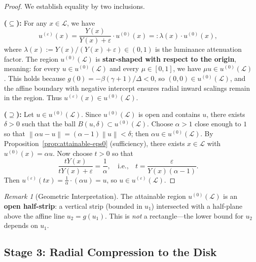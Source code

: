 \documentclass[11pt]{article}
\theoremstyle{plain}
\theoremstyle{definition}
\theoremstyle{remark}
\newtheorem{remark}[theorem]{Remark}
\newcommand{\norm}[1]{\left\lVert #1 \right\rVert}
\begin{document}
\begin{proof}
We establish equality by two inclusions.

\textbf{($\subseteq$):} For any $x \in \mathcal{L}$, we have
\begin{equation}
u^{(\varepsilon)}(x) = \frac{Y(x)}{Y(x) + \varepsilon} \cdot u^{(0)}(x) =: \lambda(x) \cdot u^{(0)}(x),
\end{equation}
where $\lambda(x) := Y(x)/(Y(x) + \varepsilon) \in (0, 1)$ is the luminance attenuation factor. The region $u^{(0)}(\mathcal{L})$ is \textbf{star-shaped with respect to the origin}, meaning: for every $u \in u^{(0)}(\mathcal{L})$ and every $\mu \in [0,1]$, we have $\mu u \in u^{(0)}(\mathcal{L})$. This holds because $g(0) = -\beta(\gamma+1)/\Delta < 0$, so $(0,0) \in u^{(0)}(\mathcal{L})$, and the affine boundary with negative intercept ensures radial inward scalings remain in the region. Thus $u^{(\varepsilon)}(x) \in u^{(0)}(\mathcal{L})$.

\textbf{($\supseteq$):} Let $u \in u^{(0)}(\mathcal{L})$. Since $u^{(0)}(\mathcal{L})$ is open and contains $u$, there exists $\delta > 0$ such that the ball $B(u, \delta) \subset u^{(0)}(\mathcal{L})$. Choose $\alpha > 1$ close enough to $1$ so that $\norm{\alpha u - u} = (\alpha - 1)\norm{u} < \delta$; then $\alpha u \in u^{(0)}(\mathcal{L})$. By Proposition~\ref{prop:attainable-eps0} (sufficiency), there exists $x \in \mathcal{L}$ with $u^{(0)}(x) = \alpha u$. Now choose $t > 0$ so that
\begin{equation}
\frac{tY(x)}{tY(x) + \varepsilon} = \frac{1}{\alpha}, \quad \text{i.e.,} \quad t = \frac{\varepsilon}{Y(x)(\alpha - 1)}.
\end{equation}
Then $u^{(\varepsilon)}(tx) = \frac{1}{\alpha} \cdot (\alpha u) = u$, so $u \in u^{(\varepsilon)}(\mathcal{L})$.
\end{proof}

\begin{remark}[Geometric Interpretation]
The attainable region $u^{(0)}(\mathcal{L})$ is an \textbf{open half-strip}: a vertical strip (bounded in $u_1$) intersected with a half-plane above the affine line $u_2 = g(u_1)$. This is \emph{not} a rectangle---the lower bound for $u_2$ depends on $u_1$.
\end{remark}

\subsection{Stage 3: Radial Compression to the Disk}
\end{document}
